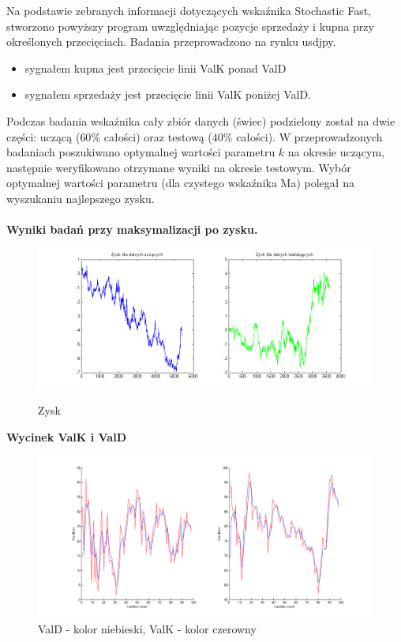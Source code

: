 Na podstawie zebranych informacji dotyczących wskaźnika Stochastic Fast, stworzono powyższy program uwzględniając pozycje sprzedaży i kupna przy określonych przecięciach. Badania przeprowadzono na rynku usdjpy.
\begin{itemize}
\item sygnałem kupna jest przecięcie linii ValK ponad ValD
\item sygnałem sprzedaży jest przecięcie linii ValK poniżej ValD.
\end{itemize}
Podczas badania wskaźnika cały zbiór danych (świec) podzielony został na dwie części: uczącą ($60\%$ całości) oraz testową ($40\%$ całości). W przeprowadzonych badaniach poszukiwano optymalnej wartości parametru $k$ na okresie uczącym, następnie weryfikowano otrzymane wyniki na okresie testowym. Wybór optymalnej wartości parametru (dla czystego wskaźnika Ma) polegał na wyszukaniu najlepszego zysku. \\
\newpage
\noindent \textbf{\\Wyniki badań przy maksymalizacji po zysku.}\\
\begin{figure}[h!]
\centering
\includegraphics[scale=0.6]{SF_zysk_us.png}\\
\caption{Zysk}
\end{figure}
\FloatBarrier
\noindent \textbf{Wycinek ValK i ValD}\\
\begin{figure}[h!]
\centering
\includegraphics[scale=0.4]{ValD_ValK_us.png}
\caption{ValD - kolor niebieski, ValK - kolor czerowny }
\end{figure}
\FloatBarrier
%
